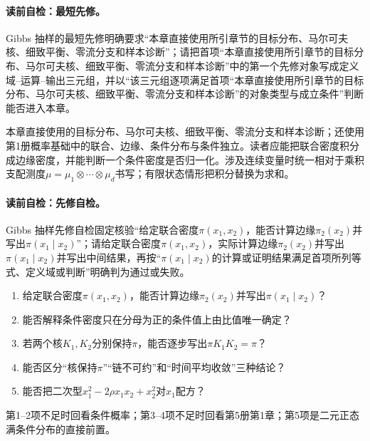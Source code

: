 \label{struct:V5-C04-CH02}
\paragraph{读前自检：最短先修。}Gibbs 抽样的最短先修明确要求“本章直接使用所引章节的目标分布、马尔可夫核、细致平衡、\MetropolisHastings{}零流分支和样本诊断”；请把首项“本章直接使用所引章节的目标分布、马尔可夫核、细致平衡、\MetropolisHastings{}零流分支和样本诊断”中的第一个先修对象写成定义域--运算--输出三元组，并以“该三元组逐项满足首项“本章直接使用所引章节的目标分布、马尔可夫核、细致平衡、\MetropolisHastings{}零流分支和样本诊断”的对象类型与成立条件”判断能否进入本章。\par

\begin{prerequisitebox}
本章直接使用的目标分布、马尔可夫核、细致平衡、\MetropolisHastings{}零流分支和样本诊断；还使用第1册概率基础中的联合、边缘、条件分布与条件独立。读者应能把联合密度积分成边缘密度，并能判断一个条件密度是否归一化。涉及连续变量时统一相对于乘积支配测度$\mu=\mu_1\otimes\cdots\otimes\mu_d$书写；有限状态情形把积分替换为求和。
\end{prerequisitebox}

\label{struct:V5-C04-CH03}
\paragraph{读前自检：先修自检。}Gibbs 抽样先修自检固定核验“给定联合密度$\pi(x_1,x_2)$，能否计算边缘$\pi_2(x_2)$并写出$\pi(x_1\mid x_2)$”；请给定联合密度$\pi(x_1,x_2)$，实际计算边缘$\pi_2(x_2)$并写出$\pi(x_1\mid x_2)$并写出中间结果，再按“$\pi(x_1\mid x_2)$的计算或证明结果满足首项所列等式、定义域或判断”明确判为通过或失败。\par

\begin{precheckbox}
\begin{enumerate}[leftmargin=2.2em]
  \item 给定联合密度$\pi(x_1,x_2)$，能否计算边缘$\pi_2(x_2)$并写出$\pi(x_1\mid x_2)$？
  \item 能否解释条件密度只在分母为正的条件值上由比值唯一确定？
  \item 若两个核$K_1,K_2$分别保持$\pi$，能否逐步写出$\pi K_1K_2=\pi$？
  \item 能否区分“核保持$\pi$”“链不可约”和“时间平均收敛”三种结论？
  \item 能否把二次型$x_1^2-2\rho x_1x_2+x_2^2$对$x_1$配方？
\end{enumerate}
第1--2项不足时回看条件概率；第3--4项不足时回看第5册第1章；第5项是二元正态满条件分布的直接前置。
\end{precheckbox}


